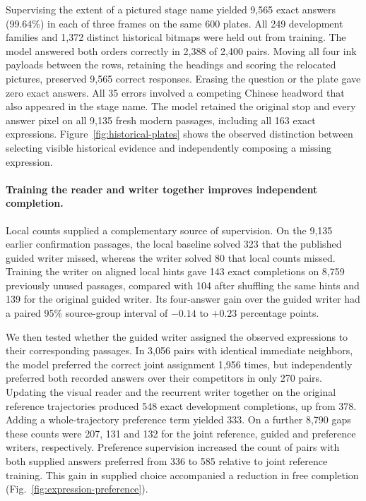 \documentclass[12pt,a4paper]{article}
\providecommand{\DIFadd}[1]{{\protect\color{blue} \sf #1}} %
\begin{document}
\DIFadd{Supervising the extent of a pictured stage name yielded 9,565 exact answers (99.64\%) in each of three frames on the same 600 plates. All 249 development families and 1,372 distinct historical bitmaps were held out from training. The model answered both orders correctly in 2,388 of 2,400 pairs. Moving all four ink payloads between the rows, retaining the headings and scoring the relocated pictures, preserved 9,565 correct responses. Erasing the question or the plate gave zero exact answers. All 35 errors involved a competing Chinese headword that also appeared in the stage name. The model retained the original stop and every answer pixel on all 9,135 fresh modern passages, including all 163 exact expressions. Figure~\ref{fig:historical-plates} shows the observed distinction between selecting visible historical evidence and independently composing a missing expression.
}

\paragraph{\DIFadd{Training the reader and writer together improves independent completion.}}
\DIFadd{Local counts supplied a complementary source of supervision. On the 9,135 earlier confirmation passages, the local baseline solved 323 that the published guided writer missed, whereas the writer solved 80 that local counts missed. Training the writer on aligned local hints gave 143 exact completions on 8,759 previously unused passages, compared with 104 after shuffling the same hints and 139 for the original guided writer. Its four-answer gain over the guided writer had a paired 95\% source-group interval of $-0.14$ to $+0.23$ percentage points.
}

\DIFadd{We then tested whether the guided writer assigned the observed expressions to their corresponding passages. In 3,056 pairs with identical immediate neighbors, the model preferred the correct joint assignment 1,956 times, but independently preferred both recorded answers over their competitors in only 270 pairs. Updating the visual reader and the recurrent writer together on the original reference trajectories produced 548 exact development completions, up from 378. Adding a whole-trajectory preference term yielded 333. On a further 8,790 gaps these counts were 207, 131 and 132 for the joint reference, guided and preference writers, respectively. Preference supervision increased the count of pairs with both supplied answers preferred from 336 to 585 relative to joint reference training. This gain in supplied choice accompanied a reduction in free completion (Fig.~\ref{fig:expression-preference}).
}
\end{document}
